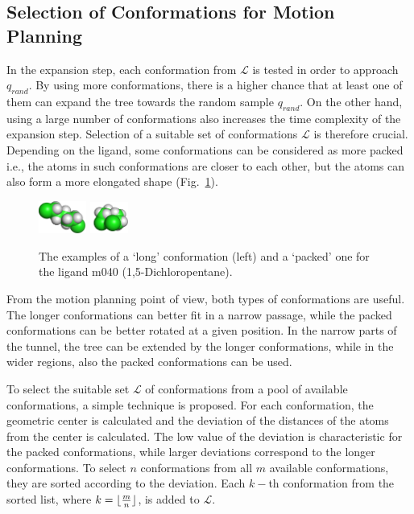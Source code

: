 \documentclass[usletter, 10pt, conference]{ieeeconf} %
\def\qrand{q_{rand}}
\def\L{\mathcal{L}}
\begin{document}
\subsection{Selection of Conformations for Motion Planning}
\label{sec::strat}

In the expansion step, each conformation from $\L$ is tested in order to approach $\qrand$.
By using more conformations, there is a higher chance that at least one of them can expand the tree towards the random sample $\qrand$.
On the other hand, using a large number of conformations also increases the time complexity of the expansion step.
Selection of a suitable set of conformations $\L$ is therefore crucial.
Depending on the ligand, some conformations can be considered as more packed i.e., the atoms in such conformations are closer to each other, but 
the atoms can also form a more elongated shape (Fig.~\ref{fig::m040c}).

\begin{figure}[b]
\centering
\includegraphics[width=0.14\textwidth]{fig/m040-conf1} \hskip 25pt
\includegraphics[width=0.11\textwidth]{fig/m040-conf2}
\caption{\label{fig::m040c}
 The examples of a `long' conformation (left) and a `packed' one for the ligand m040 (1,5-Dichloropentane).
}
\end{figure}

From the motion planning point of view, both types of conformations are useful.
The longer conformations can better fit in a narrow passage, while the packed conformations can be better rotated at a given position.
In the narrow parts of the tunnel, the tree can be extended by the longer conformations, while in the wider regions, also the
packed conformations can be used.

To select the suitable set $\L$ of conformations from a pool of available conformations, a simple technique is proposed.  
For each conformation, the geometric center is calculated and the deviation of the distances of the atoms from the center is calculated.
The low value of the deviation is characteristic for the packed conformations, while larger deviations correspond to the longer conformations.
To select $n$ conformations from all $m$ available conformations, they are sorted according to the deviation.
Each $k-$th conformation from the sorted list, where $k=\lfloor{m\over n}\rfloor$, is added to $\L$.
\end{document}
